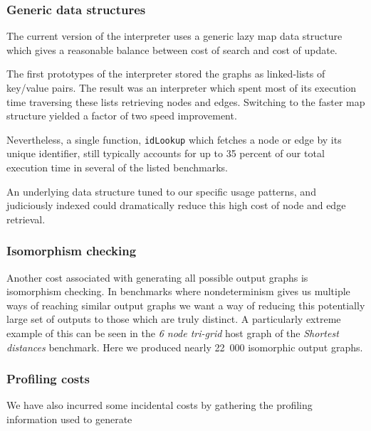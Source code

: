 \subsubsection*{Generic data structures}

The current version of the interpreter uses a generic lazy map data structure which gives a reasonable balance between cost of search and cost of update. 



The first prototypes of the interpreter stored the graphs as linked-lists of key/value pairs. The result was an interpreter which spent most of its execution time traversing these lists retrieving nodes and edges. Switching to the faster map structure yielded a factor of two speed improvement.

Nevertheless, a single function, \texttt{idLookup} which fetches a node or edge by its unique identifier, still typically accounts for up to 35 percent of our total execution time in several of the listed benchmarks.

An underlying data structure tuned to our specific usage patterns, and judiciously indexed could dramatically reduce this high cost of node and edge retrieval.


\subsubsection*{Isomorphism checking}

Another cost associated with generating all possible output graphs is isomorphism checking. In benchmarks where nondeterminism gives us multiple ways of reaching similar output graphs we want a way of reducing this potentially large set of outputs to those which are truly distinct. A particularly extreme example of this can be seen in the \textit{6 node tri-grid} host graph of the \textit{Shortest distances} benchmark. Here we produced nearly 22~000 isomorphic output graphs.


\subsubsection*{Profiling costs}

We have also incurred some incidental costs by gathering the profiling information used to generate 



